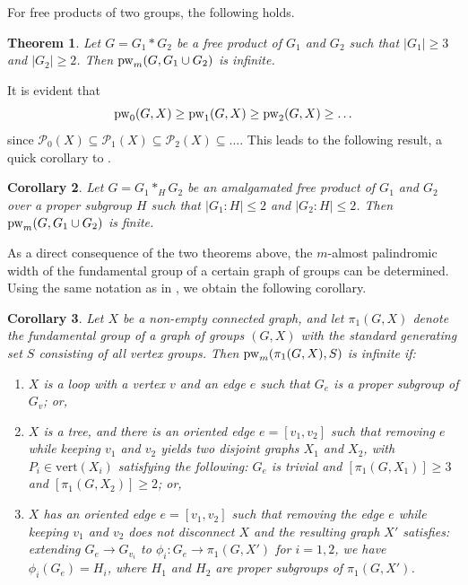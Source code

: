\documentclass[12pt]{amsart}
\newtheorem{theorem}{Theorem}[section]
\newtheorem{cor}[theorem]{Corollary}
\theoremstyle{definition}
\theoremstyle{remark}
\numberwithin{equation}{subsection}
\theoremstyle{plain}
\numberwithin{equation}{section}
\begin{document}
For free products of two groups, the following holds. 

\begin{theorem}\label{freeprod}
    Let $G = G_1 * G_2$ be a free product of $G_1$ and $G_2$ such that $|G_1| \geq 3$ and $|G_2 | \geq 2$. Then ${\rm pw}_m (G, G_1 \cup G_2)$ is infinite. 
\end{theorem}

It is evident that $${\rm pw}_0(G,X) \geq {\rm pw}_1(G,X) \geq {\rm pw}_2(G,X) \geq \ldots$$
since $\mathcal{P}_0(X) \subseteq \mathcal{P}_1(X) \subseteq \mathcal{P}_2(X) \subseteq \ldots$. This leads to the following result, a quick corollary to \cite[Proposition~3.13]{GK}.

\begin{cor}\label{fincor}
    Let $G = G_1*_H G_2$ be an amalgamated free product of $G_1$ and $G_2$ over a proper subgroup $H$ such that $|G_1 : H| \leq 2$ and $|G_2 : H| \leq 2$. Then ${\rm pw}_m (G, G_1 \cup G_2)$ is finite. 
\end{cor}
As a direct consequence of the two theorems above, the $m$-almost palindromic width of the fundamental group of a certain graph of groups can be determined. Using the same notation as in \cite{GK}, we obtain the following corollary. 

\begin{cor}\label{cor10}
    Let $X$ be a non-empty connected graph, and let $\pi_1(G,X)$ denote the fundamental group of a graph of groups $(G,X)$ with the standard generating set $S$ consisting of all vertex groups. Then ${\rm pw}_m (\pi_1(G,X), S)$ is infinite if: 
    
    \begin{enumerate}
        \item \label{cor1} $X$ is a loop with a vertex $v$ and an edge $e$ such that $G_e$ is a proper subgroup of $G_v$; or,
        
       \medskip  \item \label{cor2} $X$ is a tree, and there is an oriented edge $e = [v_1, v_2]$ such that removing $e$ while keeping $v_1$ and $v_2$ yields two disjoint graphs $X_1$ and $X_2$, with $P_i \in \text{vert}(X_i)$ satisfying the following: $G_e$ is trivial and $[\pi_1(G, X_1)] \geq 3$ and $[\pi_1(G, X_2)] \geq 2$; or,
        
     \medskip    \item \label{cor3} $X$ has an oriented edge $e = [v_1, v_2]$ such that removing the edge $e$ while keeping $v_1$ and $v_2$ does not disconnect $X$ and the resulting graph $X'$ satisfies: extending $G_e \to G_{v_i}$ to $\phi_i: G_e \to \pi_1(G, X')$ for $i = 1, 2$, we have $\phi_i(G_e) = H_i$, where $H_1$ and $H_2$ are proper subgroups of $\pi_1(G, X')$.
    \end{enumerate}
\end{cor}
\end{document}

